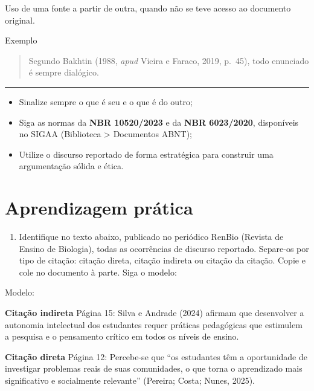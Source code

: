 \documentclass[
  letterpaper,
  DIV=11,
  numbers=noendperiod]{scrreprt}
\providecommand{\tightlist}{%
  \setlength{\itemsep}{0pt}\setlength{\parskip}{0pt}}
\begin{document}
Uso de uma fonte a partir de outra, quando não se teve acesso ao
documento original.

Exemplo

\begin{quote}
Segundo Bakhtin (1988, \emph{apud} Vieira e Faraco, 2019, p.~45), todo
enunciado é sempre dialógico.
\end{quote}

\begin{center}\rule{0.5\linewidth}{0.5pt}\end{center}

\begin{itemize}
\tightlist
\item
  Sinalize sempre o que é seu e o que é do outro;
\item
  Siga as normas da \textbf{NBR 10520/2023} e da \textbf{NBR 6023/2020},
  disponíveis no SIGAA (Biblioteca \textgreater{} Documentos ABNT);
\item
  Utilize o discurso reportado de forma estratégica para construir uma
  argumentação sólida e ética.
\end{itemize}

\section{Aprendizagem prática}\label{aprendizagem-pruxe1tica-6}

\begin{enumerate}
\def\labelenumi{\arabic{enumi}.}
\setcounter{enumi}{1}
\tightlist
\item
  Identifique no texto abaixo, publicado no periódico RenBio (Revista de
  Ensino de Biologia), todas as ocorrências de discurso reportado.
  Separe-os por tipo de citação: citação direta, citação indireta ou
  citação da citação. Copie e cole no documento à parte. Siga o modelo:
\end{enumerate}

Modelo:

\textbf{Citação indireta} Página 15: Silva e Andrade (2024) afirmam que
desenvolver a autonomia intelectual dos estudantes requer práticas
pedagógicas que estimulem a pesquisa e o pensamento crítico em todos os
níveis de ensino.

\textbf{Citação direta} Página 12: Percebe-se que ``os estudantes têm a
oportunidade de investigar problemas reais de suas comunidades, o que
torna o aprendizado mais significativo e socialmente relevante''
(Pereira; Costa; Nunes, 2025).
\end{document}
